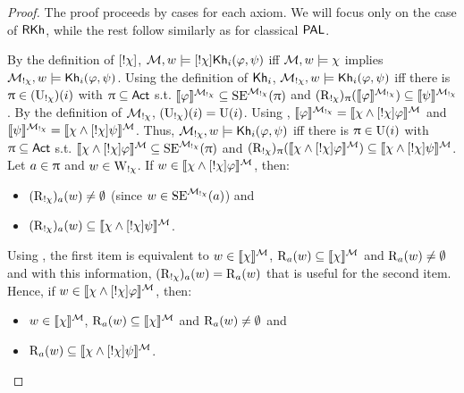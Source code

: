 	\begin{proof} The proof proceeds by cases for each axiom. We will focus only on the case of $\textsf{RKh}$, while the rest follow similarly as for classical $\textsf{PAL}$.

	By the definition of $[!\chi]$, $\mathcal{M},w \models [!\chi]{\sf Kh}_i(\varphi,\psi)$ iff $\mathcal{M},w \models \chi$ implies $\mathcal{M}_{!\chi},w \models {\sf Kh}_i(\varphi,\psi)$. Using the definition of ${\sf Kh}_i$, $\mathcal{M}_{!\chi},w \models {\sf Kh}_i(\varphi,\psi)$ iff there is $\uppi \in (\operatorname{U}_{!\chi})(i)$ with $\uppi \subseteq {\rm \sf Act}$ s.t. $\llbracket \varphi \rrbracket^{\mathcal{M}_{!\chi}} \subseteq \operatorname{SE}^{\mathcal{M}_{!\chi}}(\uppi)$ and $(\operatorname{R}_{!\chi})_\uppi(\llbracket \varphi \rrbracket^{\mathcal{M}_{!\chi}}) \subseteq \llbracket \psi \rrbracket^{\mathcal{M}_{!\chi}}$.
	By the definition of $\mathcal{M}_{!\chi}$, $(\operatorname{U}_{!\chi})(i)=\operatorname{U}(i)$. Using , $\llbracket \varphi \rrbracket^{\mathcal{M}_{!\chi}} = \llbracket \chi \wedge [!\chi]\varphi \rrbracket^{\mathcal{M}}$ and $\llbracket \psi \rrbracket^{\mathcal{M}_{!\chi}} = \llbracket \chi \wedge [!\chi]\psi \rrbracket^{\mathcal{M}}$.
	Thus, $\mathcal{M}_{!\chi},w \models {\sf Kh}_i(\varphi,\psi)$ iff there is $\uppi \in \operatorname{U}(i)$ with $\uppi \subseteq {\rm \sf Act}$ s.t. $\llbracket \chi \wedge [!\chi]\varphi \rrbracket^{\mathcal{M}} \subseteq \operatorname{SE}^{\mathcal{M}_{!\chi}}(\uppi)$ and $(\operatorname{R}_{!\chi})_\uppi(\llbracket \chi \wedge [!\chi]\varphi \rrbracket^{\mathcal{M}}) \subseteq \llbracket \chi \wedge [!\chi]\psi \rrbracket^{\mathcal{M}}$.
	Let $a \in \uppi$ and $w \in \operatorname{W}_{!\chi}$. If $w \in \llbracket \chi \wedge [!\chi]\varphi \rrbracket^{\mathcal{M}}$, then:
	\begin{itemize}
		\item $(\operatorname{R}_{!\chi})_a(w) \neq \emptyset$ (since $w \in \operatorname{SE}^{\mathcal{M}_{!\chi}}(a)$) and
		\item $(\operatorname{R}_{!\chi})_a(w) \subseteq \llbracket \chi \wedge [!\chi]\psi \rrbracket^{\mathcal{M}}$.
	\end{itemize}
	Using , the first item is equivalent to $w \in \llbracket \chi \rrbracket^{\mathcal{M}}$, $\operatorname{R}_a(w) \subseteq \llbracket \chi \rrbracket^{\mathcal{M}}$ and $\operatorname{R}_a(w) \neq \emptyset$ and with this information, $(\operatorname{R}_{!\chi})_a(w) = \operatorname{R}_a(w)$ that is useful for the second item.
	Hence, if $w \in \llbracket \chi \wedge [!\chi]\varphi \rrbracket^{\mathcal{M}}$, then:
	\begin{itemize}
		\item $w \in \llbracket \chi \rrbracket^{\mathcal{M}}$, $\operatorname{R}_a(w) \subseteq \llbracket \chi \rrbracket^{\mathcal{M}}$ and $\operatorname{R}_a(w) \neq \emptyset$ and
		\item $\operatorname{R}_a(w) \subseteq \llbracket \chi \wedge [!\chi]\psi \rrbracket^{\mathcal{M}}$.

\end{itemize}
\end{proof}
